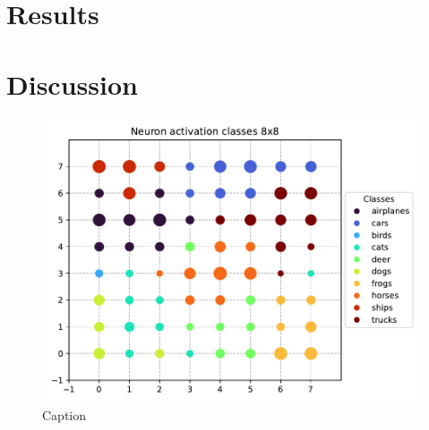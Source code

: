 \section{Results}

\section{Discussion}


\begin{figure}
    \centering
    \includegraphics{figs/som-clusters-mt.pdf}
    \caption{Caption}
    \label{fig:enter-label}
\end{figure}


